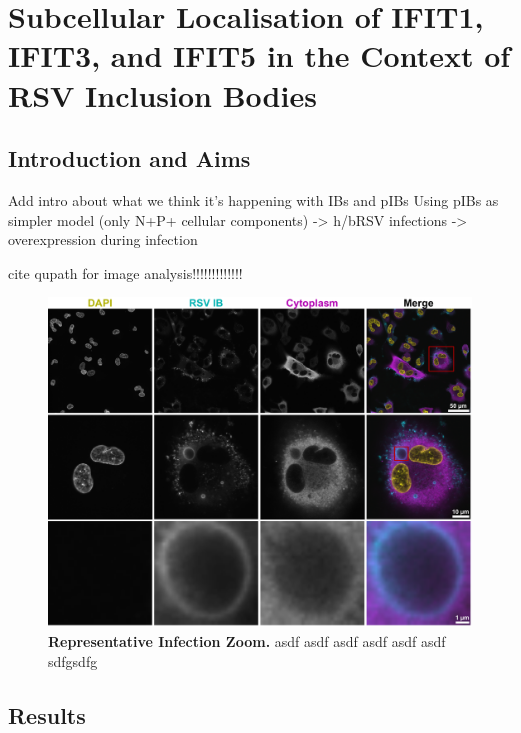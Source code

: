 \chapter{Subcellular Localisation of IFIT1, IFIT3, and IFIT5 in the Context of RSV Inclusion Bodies} \label{ch:Subcellular Localisation of IFIT1, IFIT3, and IFIT5 in the Context of RSV Inclusion Bodies}

\section{Introduction and Aims} \label{sec:Introduction and Aims-Chapter4}
Add intro about what we think it’s happening with IBs and pIBs \newline
Using pIBs as simpler model (only N+P+ cellular components) -> h/bRSV infections -> overexpression during infection


cite qupath for image analysis!!!!!!!!!!!!!


\begin{figure}
    \centering
    \includegraphics[width=1\linewidth]{09. Chapter 4//Figs//01. Introduction/IB-zooms.pdf}
    \caption[Representative Infection Zoom.]{\textbf{Representative Infection Zoom.} asdf asdf asdf asdf asdf asdf sdfgsdfg}
    \label{fig:Representative Infection Zoom}
\end{figure}

\section{Results} \label{sec:Results-Chapter4}





